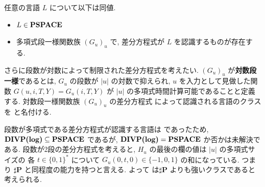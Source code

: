  \begin{lemma}
  \label{WeakFeedback}
  任意の言語 $L$ について以下は同値.
  \begin{itemize}
   \item  $L \in  {\bf PSPACE}$
   \item  多項式段一様関数族 $(G_u)_u$ で,
	  差分方程式が $L$ を認識するものが存在する.
  \end{itemize}
 \end{lemma}



 さらに段数が対数によって制限された差分方程式を考えたい.
 $(G_u)_u$ が{\bf 対数段一様}であるとは,
 $G_u$ の段数が $|u|$ の対数で抑えられ, 
 $u$ を入力として見做した関数 $G(u, i, T, Y) = G_u(i, T, Y)$ が
 $|u|$ の多項式時間計算可能であることと定義する.
 対数段一様関数族 $(G_u)_u$ の差分方程式
 によって認識される言語のクラスを \DIVPlog と名付ける.

 段数が多項式である差分方程式が認識する言語は \PSPACE であったため,
 $\text{\bf DIVP(log)} \subseteq {\bf PSPACE}$ であるが, $\text{\bf DIVP(log)} = {\bf PSPACE}$ か否かは未解決である.
 段数が2段の差分方程式を考えると,
 $H_u$ の最後の欄の値は
 $|u|$ の多項式サイズの 各 $t \in \{0,1\}^*$ について
 $G_u(0, t, 0) \in \{-1, 0, 1\}$ の和になっている.
 つまり $\sharp${\bf P} と同程度の能力を持つと言える.
 よって \DIVPlog は$\sharp${\bf P} よりも強いクラスであると考えられる.
